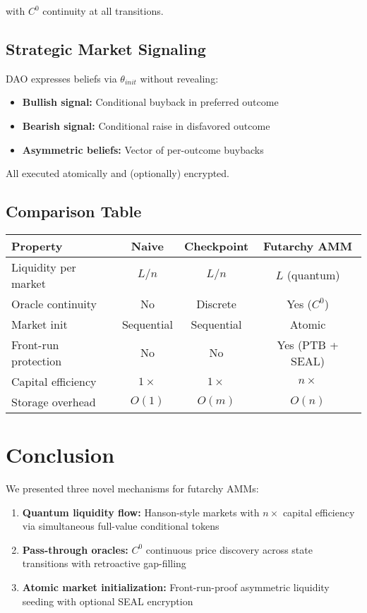 \documentclass{article}
\begin{document}
with $C^0$ continuity at all transitions.

\subsection{Strategic Market Signaling}

DAO expresses beliefs via $\theta_{init}$ without revealing:
\begin{itemize}
\item \textbf{Bullish signal:} Conditional buyback in preferred outcome
\item \textbf{Bearish signal:} Conditional raise in disfavored outcome
\item \textbf{Asymmetric beliefs:} Vector of per-outcome buybacks
\end{itemize}

All executed atomically and (optionally) encrypted.

\subsection{Comparison Table}

\begin{center}
\begin{tabular}{|l|c|c|c|}
\hline
\textbf{Property} & \textbf{Naive} & \textbf{Checkpoint} & \textbf{Futarchy AMM} \\
\hline
Liquidity per market & $L/n$ & $L/n$ & $L$ (quantum) \\
Oracle continuity & No & Discrete & Yes ($C^0$) \\
Market init & Sequential & Sequential & Atomic \\
Front-run protection & No & No & Yes (PTB + SEAL) \\
Capital efficiency & $1\times$ & $1\times$ & $n\times$ \\
Storage overhead & $O(1)$ & $O(m)$ & $O(n)$ \\
\hline
\end{tabular}
\end{center}

\section{Conclusion}

We presented three novel mechanisms for futarchy AMMs:

\begin{enumerate}
\item \textbf{Quantum liquidity flow:} Hanson-style markets with $n\times$ capital efficiency via simultaneous full-value conditional tokens
\item \textbf{Pass-through oracles:} $C^0$ continuous price discovery across state transitions with retroactive gap-filling
\item \textbf{Atomic market initialization:} Front-run-proof asymmetric liquidity seeding with optional SEAL encryption
\end{enumerate}
\end{document}
